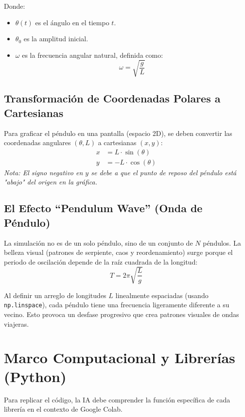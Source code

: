\documentclass[a4paper,11pt]{article}
\begin{document}
	Donde:
	\begin{itemize}
		\item $\theta(t)$ es el ángulo en el tiempo $t$.
		\item $\theta_0$ es la amplitud inicial.
		\item $\omega$ es la frecuencia angular natural, definida como:
		\begin{equation}
			\omega = \sqrt{\frac{g}{L}}
		\end{equation}
	\end{itemize}
	
	\subsection{Transformación de Coordenadas Polares a Cartesianas}
	Para graficar el péndulo en una pantalla (espacio 2D), se deben convertir las coordenadas angulares $(\theta, L)$ a cartesianas $(x, y)$:
	\begin{align}
		x &= L \cdot \sin(\theta) \\
		y &= -L \cdot \cos(\theta)
	\end{align}
	\textit{Nota: El signo negativo en $y$ se debe a que el punto de reposo del péndulo está "abajo" del origen en la gráfica.}
	
	\subsection{El Efecto ``Pendulum Wave'' (Onda de Péndulo)}
	La simulación no es de un solo péndulo, sino de un conjunto de $N$ péndulos. La belleza visual (patrones de serpiente, caos y reordenamiento) surge porque el periodo de oscilación depende de la raíz cuadrada de la longitud:
	\begin{equation}
		T = 2\pi \sqrt{\frac{L}{g}}
	\end{equation}
	
	Al definir un arreglo de longitudes $L$ linealmente espaciadas (usando \texttt{np.linspace}), cada péndulo tiene una frecuencia ligeramente diferente a su vecino. Esto provoca un desfase progresivo que crea patrones visuales de ondas viajeras.
	
	\section{Marco Computacional y Librerías (Python)}
	Para replicar el código, la IA debe comprender la función específica de cada librería en el contexto de Google Colab.
	
\end{document}
